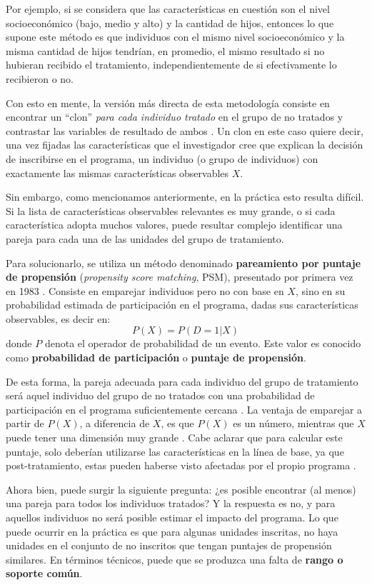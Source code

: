 \documentclass[../../main.tex]{subfiles}
\begin{document}
Por ejemplo, si se considera que las características en cuestión son el nivel
socioeconómico (bajo, medio y alto) y la cantidad de hijos, entonces lo que supone este
método es que individuos con el mismo nivel socioeconómico y la misma cantidad de hijos
tendrían, en promedio, el mismo resultado si no hubieran recibido el tratamiento,
independientemente de si efectivamente lo recibieron o no.

Con esto en mente, la versión más directa de esta metodología consiste en encontrar un
``clon'' \textit{para cada individuo tratado} en el grupo de no tratados y contrastar las
variables de resultado de ambos \cite{bernal}. Un clon en este caso quiere decir, una vez
fijadas las características que el investigador cree que explican la decisión de
inscribirse en el programa, un individuo (o grupo de individuos) con exactamente las
mismas características observables \(X\).

Sin embargo, como mencionamos anteriormente, en la práctica esto resulta difícil. Si la
lista de características observables relevantes es muy grande, o si cada característica
adopta muchos valores, puede resultar complejo identificar una pareja para cada una de las
unidades del grupo de tratamiento.

Para solucionarlo, se utiliza un método denominado \textbf{pareamiento por puntaje de
propensión} (\textit{propensity score matching}, PSM), presentado por primera vez en 1983
\cite{psm1983}. Consiste en emparejar individuos pero no con base en \(X\), sino en su
probabilidad estimada de participación en el programa, dadas sus características
observables, es decir en:
\[P(X) = P(D = 1|X)\] donde \(P\) denota el operador de probabilidad de un evento. Este
valor es conocido como \textbf{probabilidad de participación} o \textbf{puntaje de
propensión}.

De esta forma, la pareja adecuada para cada individuo del grupo de tratamiento será aquel
individuo del grupo de no tratados con una probabilidad de participación en el programa
suficientemente cercana \cite{bernal}. La ventaja de emparejar a partir de \(P(X)\), a
diferencia de \(X\), es que \(P(X)\) es un número, mientras que \(X\) puede tener una
dimensión muy grande \cite{bernal}. Cabe aclarar que para calcular este puntaje, solo
deberían utilizarse las características en la línea de base, ya que post-tratamiento,
estas pueden haberse visto afectadas por el propio programa \cite{gertler-2016}.

Ahora bien, puede surgir la siguiente pregunta: ¿es posible encontrar (al menos) una pareja
para todos los individuos tratados? Y la respuesta es no, y para aquellos individuos no
será posible estimar el impacto del programa. Lo que puede ocurrir en la práctica es que
para algunas unidades inscritas, no haya unidades en el conjunto de no inscritos que
tengan puntajes de propensión similares. En términos técnicos, puede que se produzca una
falta de \textbf{rango o soporte común}.
\end{document}
